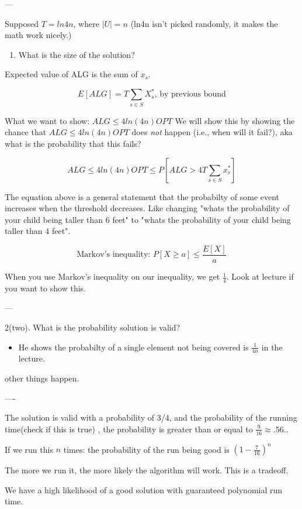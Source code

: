 \documentclass[11pt]{article}
\begin{document}
---

Supposed \(T = ln 4n\), where \(|U| = n\) (ln4n isn't picked randomly, it makes the math work nicely.)

\begin{enumerate}
\item What is the size of the solution?
\end{enumerate}
Expected value of ALG is the sum of \(x_s\).

\[ E[ALG]  = T \sum_{s \in S} X_s^* \text{, by previous bound}\]

What we want to show: \(ALG \leq 4ln(4n) OPT\)
We will show this by showing the chance that \(ALG \leq 4ln(4n) OPT\) does \emph{not} happen (i.e., when will it fail?), aka what is the probability that this fails?

\[ ALG \leq 4ln(4n) OPT \leq P[ALG > 4T \sum_{s \in S} x_s^*] \]

The equation above is a general statement that the probabilty of some event increases when the threshold decreases. Like changing "whats the probability of your child being taller than 6 feet" to "whats the probability of your child being taller than 4 feet".


\[ \text{Markov's inequality: }P[X \geq a] \leq \frac{E[X]}{a} \]

When you use Markov's inequality on our inequality, we get \(\frac{1}{4}\). Look at lecture if you want to show this.

---

2(two). What is the probability solution is valid?
\begin{itemize}
\item He shows the probabilty of a single element not being covered is \(\frac{1}{4n}\) in the lecture.
\end{itemize}

other things happen.

----

The solution is valid with a probability of 3/4, and the probability of the running time(check if this is true) , the probability is greater than or equal to \(\frac{9}{16} \approx .56\)..

If we run this \(n\) times: the probability of the run being good is \(\left( 1-\frac{7}{16} \right)^n\)


The more we run it, the more likely the algorithm will work. This is a tradeoff.

We have a high likelihood of a good solution with guaranteed polynomial run time.
\end{document}
